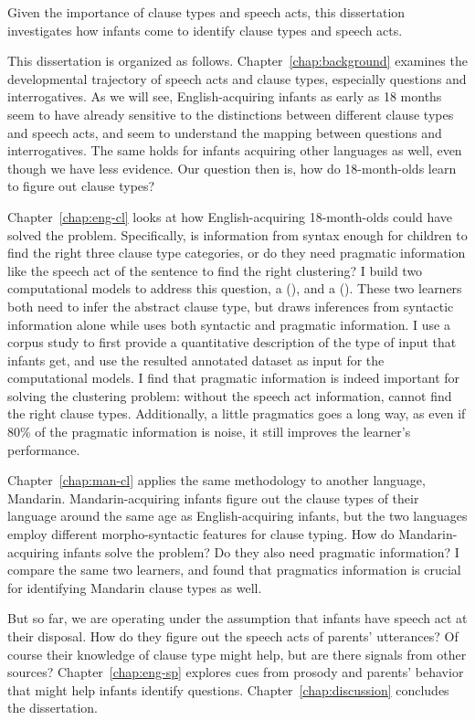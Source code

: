 Given the importance of clause types and speech acts, this dissertation investigates how infants come to identify clause types and speech acts. 


This dissertation is organized as follows. Chapter~\ref{chap:background} examines the developmental trajectory of speech acts and clause types, especially questions and interrogatives. As we will see, English-acquiring infants as early as 18 months seem to have already sensitive to the distinctions between different clause types and speech acts, and seem to understand the mapping between questions and interrogatives. The same holds for infants acquiring other languages as well, even though we have less evidence. Our question then is, how do 18-month-olds learn to figure out clause types?

Chapter~\ref{chap:eng-cl} looks at how English-acquiring 18-month-olds could have solved the problem. Specifically, is information from syntax enough for children to find the right three clause type categories, or do they need pragmatic information like the speech act of the sentence to find the right clustering? I build two computational models to address this question, a \distlearner{} (\dlearnerabbr{}), and a \praglearner{} (\plearnerabbr{}). These two learners both need to infer the abstract clause type, but \dlearnerabbr{} draws inferences from syntactic information alone while \plearnerabbr{} uses both syntactic and pragmatic information. I use a corpus study to first provide a quantitative description of the type of input that infants get, and use the resulted annotated dataset as input for the computational models. I find that pragmatic information is indeed important for solving the clustering problem: without the speech act information, \dlearnerabbr{} cannot find the right clause types. Additionally, a little pragmatics goes a long way, as  even if 80\% of the pragmatic information is noise, it still improves the learner's performance. 

Chapter~\ref{chap:man-cl} applies the same methodology to another language, Mandarin. Mandarin-acquiring infants figure out the clause types of their language around the same age as English-acquiring infants, but the two languages employ different morpho-syntactic features for clause typing. How do Mandarin-acquiring infants solve the problem? Do they also need pragmatic information? I compare the same two learners, and found that pragmatics information is crucial for identifying Mandarin clause types as well.

But so far, we are operating under the assumption that infants have speech act at their disposal. How do they figure out the speech acts of parents' utterances? Of course their knowledge of clause type might help, but are there signals from other sources? Chapter~\ref{chap:eng-sp} explores cues from prosody and parents' behavior that might help infants identify questions. Chapter~\ref{chap:discussion} concludes the dissertation.
 
